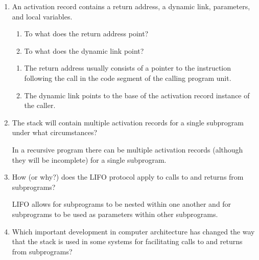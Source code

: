 \begin{enumerate}
\begin{answer}
  \end{answer}

  \item An activation record contains a return
    address, a dynamic link, parameters, and
    local variables.
  \begin{enumerate}
    \item To what does the return address point?
    \item To what does the dynamic link point?
  \end{enumerate}

  \begin{answer}

    \begin{enumerate}
      \item The return address usually consists of a pointer
      to the instruction following the call in the code
      segment of the calling program unit.
      \item The dynamic link points to the base of the
      activation record instance of the caller.
    \end{enumerate}

  \end{answer}

  \item The stack will contain multiple activation
    records for a single subprogram under what
    circumstances?

  \begin{answer}

    In a recursive program there can be multiple activation
    records (although they will be incomplete) for a single
    subprogram.

  \end{answer}

  \item How (or why?) does the LIFO protocol apply to
    calls to and returns from subprograms?

  \begin{answer}

    LIFO allows for subprograms to be nested within one
    another and for subprograms to be used as parameters
    within other subprograms.

  \end{answer}

  \item Which important development in computer architecture
    has changed the way that the stack is used in some
    systems for facilitating calls to and returns from
    subprograms?


\end{enumerate}
